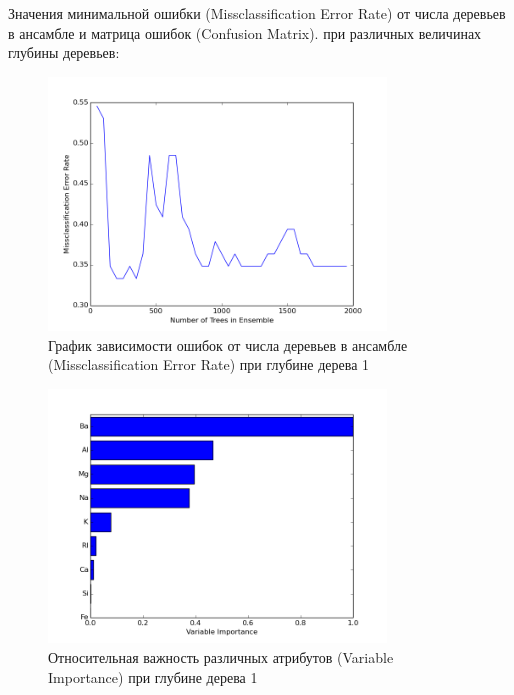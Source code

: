 \documentclass{article} %
\begin{document}
Значения минимальной ошибки (Missclassification Error Rate)
от числа деревьев в ансамбле и матрица ошибок (Confusion Matrix).
при различных величинах глубины деревьев:


\begin{figure}[H]
    \centering
    \includegraphics[width=0.8\textwidth]{mer1depth}
    \caption{График зависимости ошибок от числа деревьев в ансамбле
    (Missclassification Error Rate) при глубине дерева 1}
\end{figure}

\begin{figure}[H]
    \centering
    \includegraphics[width=0.8\textwidth]{varImp1depth}
    \caption{Относительная важность различных атрибутов
    (Variable Importance) при глубине дерева 1}
\end{figure}
\end{document}
